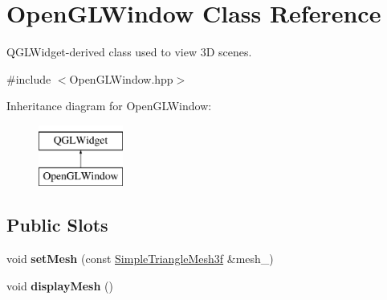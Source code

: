 \hypertarget{class_d_o_1_1_open_g_l_window}{\section{Open\-G\-L\-Window Class Reference}
\label{class_d_o_1_1_open_g_l_window}
}


Q\-G\-L\-Widget-\/derived class used to view 3\-D scenes.  




{\ttfamily \#include $<$Open\-G\-L\-Window.\-hpp$>$}

Inheritance diagram for Open\-G\-L\-Window\-:\begin{figure}[H]
\begin{center}
\leavevmode
\includegraphics[height=2.000000cm]{class_d_o_1_1_open_g_l_window}
\end{center}
\end{figure}
\subsection*{Public Slots}
\begin{DoxyCompactItemize}
\item 
\hypertarget{class_d_o_1_1_open_g_l_window_a9dd55f307c18dfbdc8bc38918cb1cbb4}{void {\bfseries set\-Mesh} (const \hyperlink{group___draw3_d_ga4f1ab8c8365dc907bff111a6f87e6141}{Simple\-Triangle\-Mesh3f} \&mesh\-\_\-)}\label{class_d_o_1_1_open_g_l_window_a9dd55f307c18dfbdc8bc38918cb1cbb4}

\item 
\hypertarget{class_d_o_1_1_open_g_l_window_adae9e33c13a9e4b9d7fb847a29c8c199}{void {\bfseries display\-Mesh} ()}\label{class_d_o_1_1_open_g_l_window_adae9e33c13a9e4b9d7fb847a29c8c199}

\end{DoxyCompactItemize}
